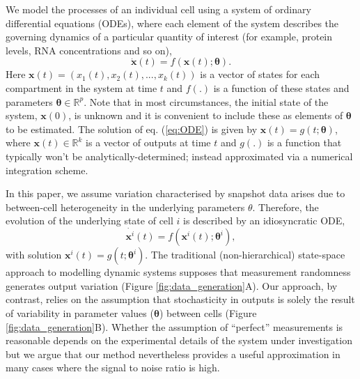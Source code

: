 \documentclass[10pt,letterpaper]{article}
\begin{document}
We model the processes of an individual cell using a system of ordinary differential equations (ODEs), where each element of the system describes the governing dynamics of a particular quantity of interest (for example, protein levels, RNA concentrations and so on),
%
\begin{equation}\label{eq:ODE}
\dot{\boldsymbol{x}}(t) = f(\boldsymbol{x}(t); \boldsymbol{\theta}).
\end{equation}
%
Here $\boldsymbol{x}(t) = (x_1(t), x_2(t), ..., x_k(t))$ is a vector of states for each compartment in the system at time $t$ and $f(.)$ is a function of these states and parameters $\boldsymbol{\theta}\in\mathbb{R}^p$. Note that in most circumstances, the initial state of the system, $\boldsymbol{x}(0)$, is unknown and it is convenient to include these as elements of $\boldsymbol{\theta}$ to be estimated. The solution of eq. (\ref{eq:ODE}) is given by $\boldsymbol{x}(t) = g(t; \boldsymbol{\theta})$, where $\boldsymbol{x}(t)\in\mathbb{R}^k$ is a vector of outputs at time $t$ and $g(.)$ is a function that typically won't be analytically-determined; instead approximated via a numerical integration scheme. 

In this paper, we assume variation characterised by snapshot data arises due to between-cell heterogeneity in the underlying parameters $\theta$. Therefore, the evolution of the underlying state of cell $i$ is described by an idiosyncratic ODE,
%
\begin{equation}
\dot{\boldsymbol{x}^i}(t) = f(\boldsymbol{x}^i(t); \boldsymbol{\theta}^i),
\end{equation}
%
with solution $\boldsymbol{x}^i(t) = g(t; \boldsymbol{\theta}^i)$. The traditional (non-hierarchical) state-space approach to modelling dynamic systems supposes that measurement randomness generates output variation (Figure \ref{fig:data_generation}A). Our approach, by contrast, relies on the assumption that stochasticity in outputs is solely the result of variability in parameter values ($\boldsymbol{\theta}$) between cells (Figure \ref{fig:data_generation}B). Whether the assumption of ``perfect'' measurements is reasonable depends on the experimental details of  the system under investigation but we argue that our method nevertheless provides a useful approximation in many cases where the signal to noise ratio is high. 
\end{document}
